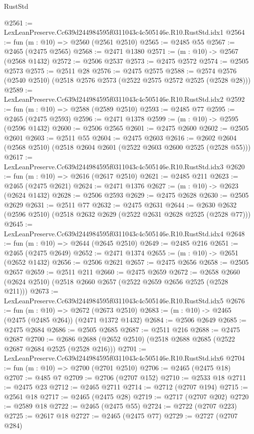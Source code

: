 \begin{lexlean}{RustStd}
\begin{coremodule}
@2561 := LexLeanPreserve.Cc639d244984595f0311043c4c505146e.R10.RustStd.idx1
@2564 := fun (m : @10) => @2560 (@2561 @2510)
@2565 := @2485 @55
@2567 := @2465 (@2475 @2565)
@2568 := @2471 @1380
@2571 := (m : @10) -> @2567 (@2568 @1432)
@2572 := @2506 @2537
@2573 := @2475 @2572
@2574 := @2505 @2573
@2575 := @2511 @28
@2576 := @2475 @2575
@2588 := @2574 @2576 (@2540 @2510) (@2518 @2576 @2573 (@2522 @2575 @2572 @2525 (@2528 @28)))
@2589 := LexLeanPreserve.Cc639d244984595f0311043c4c505146e.R10.RustStd.idx2
@2592 := fun (m : @10) => @2588 (@2589 @2510)
@2593 := @2485 @77
@2595 := @2465 (@2475 @2593)
@2596 := @2471 @1378
@2599 := (m : @10) -> @2595 (@2596 @1432)
@2600 := @2506 @2565
@2601 := @2475 @2600
@2602 := @2505 @2601
@2603 := @2511 @55
@2604 := @2475 @2603
@2616 := @2602 @2604 (@2568 @2510) (@2518 @2604 @2601 (@2522 @2603 @2600 @2525 (@2528 @55)))
@2617 := LexLeanPreserve.Cc639d244984595f0311043c4c505146e.R10.RustStd.idx3
@2620 := fun (m : @10) => @2616 (@2617 @2510)
@2621 := @2485 @211
@2623 := @2465 (@2475 @2621)
@2624 := @2471 @1376
@2627 := (m : @10) -> @2623 (@2624 @1432)
@2628 := @2506 @2593
@2629 := @2475 @2628
@2630 := @2505 @2629
@2631 := @2511 @77
@2632 := @2475 @2631
@2644 := @2630 @2632 (@2596 @2510) (@2518 @2632 @2629 (@2522 @2631 @2628 @2525 (@2528 @77)))
@2645 := LexLeanPreserve.Cc639d244984595f0311043c4c505146e.R10.RustStd.idx4
@2648 := fun (m : @10) => @2644 (@2645 @2510)
@2649 := @2485 @216
@2651 := @2465 (@2475 @2649)
@2652 := @2471 @1374
@2655 := (m : @10) -> @2651 (@2652 @1432)
@2656 := @2506 @2621
@2657 := @2475 @2656
@2658 := @2505 @2657
@2659 := @2511 @211
@2660 := @2475 @2659
@2672 := @2658 @2660 (@2624 @2510) (@2518 @2660 @2657 (@2522 @2659 @2656 @2525 (@2528 @211)))
@2673 := LexLeanPreserve.Cc639d244984595f0311043c4c505146e.R10.RustStd.idx5
@2676 := fun (m : @10) => @2672 (@2673 @2510)
@2683 := (m : @10) -> @2465 (@2475 (@2485 @264)) (@2471 @1372 @1432)
@2684 := @2506 @2649
@2685 := @2475 @2684
@2686 := @2505 @2685
@2687 := @2511 @216
@2688 := @2475 @2687
@2700 := @2686 @2688 (@2652 @2510) (@2518 @2688 @2685 (@2522 @2687 @2684 @2525 (@2528 @216)))
@2701 := LexLeanPreserve.Cc639d244984595f0311043c4c505146e.R10.RustStd.idx6
@2704 := fun (m : @10) => @2700 (@2701 @2510)
@2706 := @2465 (@2475 @18)
@2707 := @485 @7
@2709 := @2706 (@2707 @152)
@2710 := @2533 @18
@2711 := @2475 @23
@2712 := @2465 @2711
@2714 := @2712 (@2707 @194)
@2715 := @2561 @18
@2717 := @2465 (@2475 @28)
@2719 := @2717 (@2707 @202)
@2720 := @2589 @18
@2722 := @2465 (@2475 @55)
@2724 := @2722 (@2707 @223)
@2725 := @2617 @18
@2727 := @2465 (@2475 @77)
@2729 := @2727 (@2707 @284)

\end{coremodule}
\end{lexlean}
